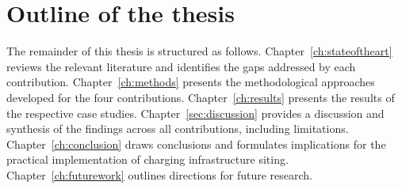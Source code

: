 \section{Outline of the thesis}
The remainder of this thesis is structured as follows.
Chapter~\ref{ch:stateoftheart} reviews the relevant literature and identifies the gaps addressed by each contribution.
Chapter~\ref{ch:methods} presents the methodological approaches developed for the four contributions.
Chapter~\ref{ch:results} presents the results of the respective case studies.
Chapter~\ref{sec:discussion} provides a discussion and synthesis of the findings across all contributions, including limitations.
Chapter~\ref{ch:conclusion} draws conclusions and formulates implications for the practical implementation of charging infrastructure siting.
Chapter~\ref{ch:futurework} outlines directions for future research.


